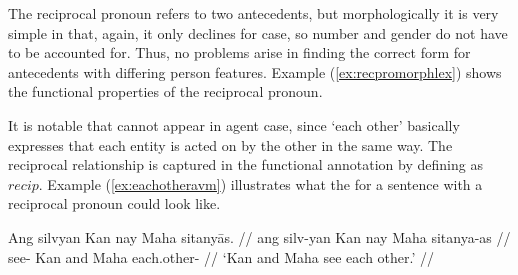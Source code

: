 The reciprocal pronoun  refers to two
antecedents, but morphologically it is very simple in that, again, it only
declines for case, so number and gender do not have to be accounted for. Thus,
no problems arise in finding the correct form for antecedents with differing
person features. Example (\ref{ex:recpromorphlex}) shows the functional
properties of the reciprocal pronoun.

\begin{morphlex}
\ex\label{ex:recpromorphlex}
\xe
\end{morphlex}

It is notable that  cannot appear in agent case, since
`each other' basically expresses that each entity is acted on by the other in
the same way. The reciprocal relationship is captured in the functional
annotation by defining \Prontype{} as $recip$. Example 
(\ref{ex:eachotheravm}) illustrates what the \Avm{} for a sentence with a
reciprocal pronoun could look like.

\ex\label{ex:eachotheravm}
\begingl
	\gla Ang silvyan {} Kan nay Maha sitanyās. //
	\glb ang silv-yan {} Kan nay Maha sitanya-as //
	\glc \AgtT{} see-\TplM{} \Top{} Kan and Maha each.other-\Parg{} //
	\glft `Kan and Maha see each other.' //
\endgl\medskip

